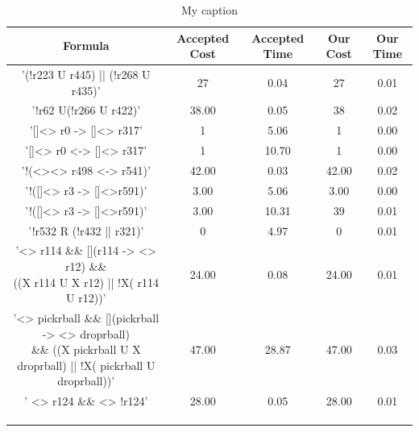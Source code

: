 \begin{landscape}
\begin{table}[]
\centering
\small
\begin{tabular}{|c|c|c|c|c|}
\hline
Formula & Accepted Cost & Accepted Time & Our Cost & Our Time \\ \hline
     '(!r223 U r445) || (!r268 U r435)'  &         27      &      0.04         &      27   &     0.01     \\ \hline
      '!r62 U(!r266 U r422)'  &         38.00      &       0.05        &     38     &     0.02     \\ \hline
       '[]<> r0 -> []<> r317' &         1      &       5.06        &    1      &    0.00     \\ \hline
       '[]<> r0 <-> []<> r317'  & 1		&		10.70		& 1 	&  0.00 \\ \hline 
      '!(<><> r498 <-> r541)' &	42.00	&	0.03	&	42.00	&	0.02	\\		\hline
      '!([]<> r3 -> []<>r591)' &	 3.00	&	5.06 	&	3.00 	&	0.00	\\		\hline
      '!([]<> r3 -> []<>r591)' &	 3.00	&	10.31	&	39	&	0.01	\\		\hline
      '!r532 R (!r432 || r321)' &	 0	&	4.97 	&	0	&	0.01 	\\		\hline
     \makecell{ '<> r114 \&\& [](r114 -> <> r12) \&\& \\((X r114 U X r12) || !X( r114 U r12))' }&	24.00	&	0.08 	&	24.00	&	0.01	\\		\hline
   \makecell{ '<> pickrball \&\& [](pickrball -> <> droprball) \\ \&\& ((X pickrball U X droprball) || !X( pickrball U droprball))' } &	47.00	&	28.87	&	47.00	&	0.03	\\		\hline
      ' <> r124 \&\& <> !r124' &	28.00	&	0.05 	&	28.00	&	0.01	\\		\hline
      &		&		&		&		\\		\hline
      &		&		&		&		\\		\hline
      &		&		&		&		\\		\hline
\end{tabular}
\caption{My caption}
\label{table}
\end{table}
\end{landscape}



